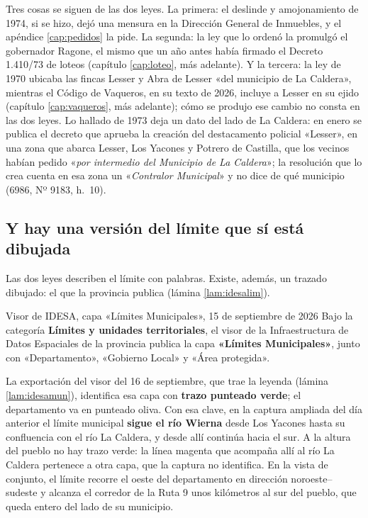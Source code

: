 Tres cosas se siguen de las dos leyes. La primera: el deslinde y amojonamiento de 1974, si se hizo, dejó una mensura en la Dirección General de Inmuebles, y el apéndice \ref{cap:pedidos} la pide. La segunda: la ley que lo ordenó la promulgó el gobernador Ragone, el mismo que un año antes había firmado el Decreto 1.410/73 de loteos (capítulo \ref{cap:loteo}, más adelante). Y la tercera: la ley de 1970 ubicaba las fincas Lesser y Abra de Lesser «del municipio de La Caldera», mientras el Código de Vaqueros, en su texto de 2026, incluye a Lesser en su ejido (capítulo \ref{cap:vaqueros}, más adelante); cómo se produjo ese cambio no consta en las dos leyes. Lo hallado de 1973 deja un dato del lado de La Caldera: en enero se publica el decreto que aprueba la creación del destacamento policial «Lesser», en una zona que abarca Lesser, Los Yacones y Potrero de Castilla, que los vecinos habían pedido «\textit{por intermedio del Municipio de La Caldera}»; la resolución que lo crea cuenta en esa zona un «\textit{Contralor Municipal}» y no dice de qué municipio (6986, Nº 9183, h.\ 10).

\subsection*{Y hay una versión del límite que sí está dibujada}

Las dos leyes describen el límite con palabras. Existe, además, un trazado dibujado: el que la provincia publica (lámina \ref{lam:idesalim}).

\begin{ficha}{Visor de IDESA, capa «Límites Municipales», 15 de septiembre de 2026}
Bajo la categoría \textbf{Límites y unidades territoriales}, el visor de la Infraestructura de
Datos Espaciales de la provincia publica la capa \textbf{«Límites Municipales»}, junto con
«Departamento», «Gobierno Local» y «Área protegida».

La exportación del visor del 16 de septiembre, que trae la leyenda (lámina \ref{lam:idesamun}), identifica esa capa con \textbf{trazo punteado verde}; el departamento va en punteado oliva. Con esa clave, en la captura ampliada del día anterior el límite municipal \textbf{sigue el río Wierna} desde Los Yacones hasta su confluencia con el río La Caldera, y desde allí continúa hacia el sur. A la altura del pueblo no hay trazo verde: la línea magenta que acompaña allí al río La Caldera pertenece a otra capa, que la captura no identifica. En la vista de conjunto, el límite recorre el oeste del departamento en dirección noroeste--sudeste y alcanza el corredor de la Ruta 9 unos kilómetros al sur del pueblo, que queda entero del lado de su municipio.
\end{ficha}


